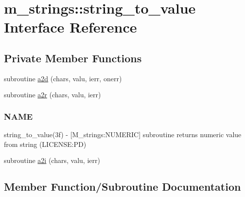 \hypertarget{interfacem__strings_1_1string__to__value}{}\section{m\+\_\+strings\+:\+:string\+\_\+to\+\_\+value Interface Reference}
\label{interfacem__strings_1_1string__to__value}
\subsection*{Private Member Functions}
\begin{DoxyCompactItemize}
\item 
subroutine \mbox{\hyperlink{interfacem__strings_1_1string__to__value_afca39f47317f33e65a7bd2cb0f8ddf58}{a2d}} (chars, valu, ierr, onerr)
\item 
subroutine \mbox{\hyperlink{interfacem__strings_1_1string__to__value_aec779c978fa7bcc812c6cb029321b5f0}{a2r}} (chars, valu, ierr)
\begin{DoxyCompactList}\small\item\em \subsubsection*{N\+A\+ME}

string\+\_\+to\+\_\+value(3f) -\/ \mbox{[}M\+\_\+strings\+:N\+U\+M\+E\+R\+IC\mbox{]} subroutine returns numeric value from string (L\+I\+C\+E\+N\+SE\+:PD) \end{DoxyCompactList}\item 
subroutine \mbox{\hyperlink{interfacem__strings_1_1string__to__value_a2089572a0b06d524be83d9089589c959}{a2i}} (chars, valu, ierr)
\end{DoxyCompactItemize}


\subsection{Member Function/\+Subroutine Documentation}
\mbox{\label{interfacem__strings_1_1string__to__value_afca39f47317f33e65a7bd2cb0f8ddf58}} 
